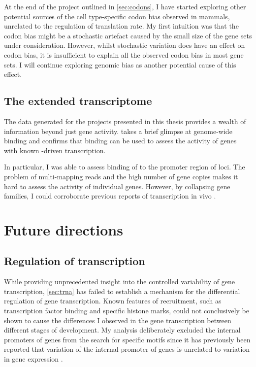At the end of the project outlined in \cref{sec:codons}, I have started
exploring other potential sources of the cell type-specific codon bias observed
in mammals, unrelated to the regulation of translation rate. My first intuition
was that the codon bias might be a stochastic artefact caused by the small size
of the gene sets under consideration. However, whilst stochastic variation does
have an effect on codon bias, it is insufficient to explain all the observed
codon bias in most gene sets. I will continue exploring genomic \gc bias as
another potential cause of this effect.

\subsection{The extended  transcriptome}

The  \chipseq data generated for the projects presented in this thesis
provides a wealth of information beyond just \trna gene activity.
 takes a brief glimpse at genome-wide  binding and confirms
that  binding can be used to assess the activity of genes with known
-driven transcription.

In particular, I was able to assess binding of  to the promoter region of
\transsine loci. The problem of multi-mapping reads and the high number of
\transsine gene copies makes it hard to assess the activity of individual
\transsine genes. However, by collapsing \transsine gene families, I could
corroborate previous reports of \transsine transcription in vivo
\citep{Carriere:2012}.

\section{Future directions}

\subsection{Regulation of  transcription}

While providing unprecedented insight into the controlled variability of \trna
gene transcription, \cref{sec:trna} has failed to establish a mechanism for the
differential regulation of \trna gene transcription. Known features of 
recruitment, such as transcription factor binding and specific histone marks,
could not conclusively be shown to cause the differences I observed in the \trna
gene transcription between different stages of development. My analysis
deliberately excluded the internal promoters of \trna genes from the search for
specific motifs since it has previously been reported that variation of the
internal promoter of \trna genes is unrelated to variation in gene expression
\citep{Oler:2010,Canella:2012}.

